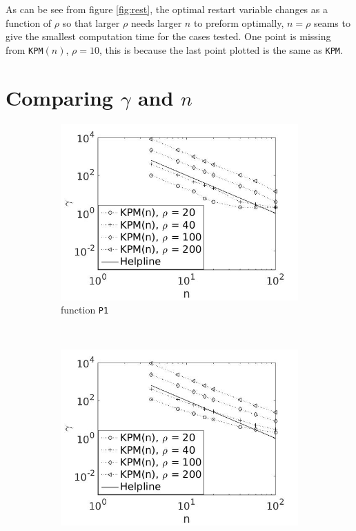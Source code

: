 As can be see from figure \ref{fig:rest}, the optimal restart variable changes as a function of $\rho$ so that larger $\rho$ needs larger $n$ to preform optimally, $n = \rho$ seams to give the smallest computation time for the cases tested. One point is missing from \texttt{KPM}$(n)$, $\rho = 10$, this is because the last point plotted is the same as \texttt{KPM}.  
\section{Comparing $\gamma$ and $n$} \label{sec:rrest}
\begin{figure}[H]
        \centering
        \begin{subfigure}[b]{0.45\textwidth}
                \includegraphics[width=\textwidth]{fig/s3antvsm1}
                \caption{function \texttt{P1}}
                \label{fig:ant1}
        \end{subfigure}%
~
        \begin{subfigure}[b]{0.45\textwidth}
                \includegraphics[width=\textwidth]{fig/s4antvsm2}

\end{subfigure}
\end{figure}
